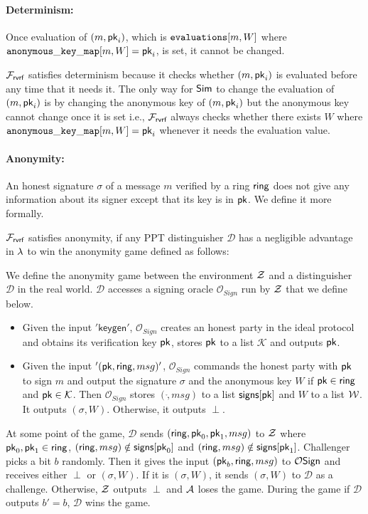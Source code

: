\paragraph{Determinism:} Once evaluation of $ (m, \mathsf{pk}_i) $, which is $ \texttt{evaluations}[m,W] $ where $ \mathtt{anonymous\_key\_map}[m,W] = \mathsf{pk}_i $, is set, it cannot be changed. 

$ \mathcal{F}_{\textsf{rvrf}} $ satisfies determinism because it checks whether $ (m, \mathsf{pk}_i) $ is evaluated before any time that it needs it. The only way for $ \mathsf{Sim} $ to change the evaluation of $ (m, \mathsf{pk}_i) $ is by changing the anonymous key of $ (m, \mathsf{pk}_i)  $ but the anonymous key cannot change once it is set i.e., $ \mathcal{F}_{\textsf{rvrf}} $ always checks whether there exists $ W $ where $ \mathtt{anonymous\_key\_map}[m,W]  = \mathsf{pk}_i$ whenever it needs the evaluation value.

\paragraph{Anonymity:} An honest signature $ \sigma $ of a message $ m $ verified by a ring $ \mathsf{ring} $ does not give any information about its signer except that its key is in $ \mathsf{pk} $. We define it more formally.

\begin{definition}[Anonymity]\label{def:anonymity}
	$ \mathcal{F}_{\textsf{rvrf}} $ satisfies anonymity, if any PPT distinguisher $ \mathcal{D} $ has a negligible advantage in $ \lambda $ to win the anonymity game defined as follows:
	
	We define the anonymity game between the environment $ \mathcal{Z} $ and a distinguisher $ \mathcal{D} $ in the real world.  $\mathcal{D}$ accesses a signing oracle $ \mathcal{O}_{Sign} $ run by $ \mathcal{Z} $ that we define below. 
	\begin{itemize}
		\item Given the input $ '\mathsf{keygen}' $, $\mathcal{O}_{Sign} $ creates an honest party in the ideal protocol and obtains its verification key $ \mathsf{pk} $, stores $ \mathsf{pk}  $ to a list $ \mathcal{K} $ and outputs $ \mathsf{pk} $.
		\item Given the input $ '(\mathsf{pk},\mathsf{ring},msg)' $, $ \mathcal{O}_{Sign} $ commands the honest party with $ \mathsf{pk}$ to sign $ m $ and output the signature $ \sigma $ and the anonymous key $ W $ if $ \mathsf{pk} \in \mathsf{ring} $ and $\mathsf{pk} \in \mathcal{K}  $.  Then $ \mathcal{O}_{Sign} $ stores $ (\ring,msg) $ to a list $ {\mathsf{signs}}[\mathsf{pk}]  $ and $ W  $ to a list $ \mathcal{W} $. It outputs $ (\sigma,W) $. Otherwise, it outputs $ \perp $.
	\end{itemize}
	At some point of the game,	
	$ \mathcal{D} $ sends $ (\mathsf{ring}, \mathsf{pk}_0, \mathsf{pk}_1, msg )$ to $ \mathcal{Z} $ where $ \mathsf{pk}_0, \mathsf{pk}_1 \in \mathsf{ring} $, $ (\mathsf{ring}, msg)  \notin {\ensuremath{\mathsf{signs}}}[\mathsf{pk}_0]$ and $ (\mathsf{ring}, msg)  \notin {\ensuremath{\mathsf{signs}}}[\mathsf{pk}_1] $.  Challenger picks a bit $ b $ randomly. Then it gives the input $ (\mathsf{pk}_b, \mathsf{ring}, msg) $ to $ \mathcal{O}\mathsf{Sign} $ and receives either $ \perp $ or $(\sigma,W)$. If it is $ (\sigma,W) $, it sends $ (\sigma,W) $ to $ \mathcal{D} $ as a challenge.
	Otherwise, $ \mathcal{Z} $ outputs $ \perp $ and $ \mathcal{A} $ loses the game.
	During the game if $ \mathcal{D} $ outputs $ b' = b $, $ \mathcal{D} $ wins the game.
	
	
\end{definition}


